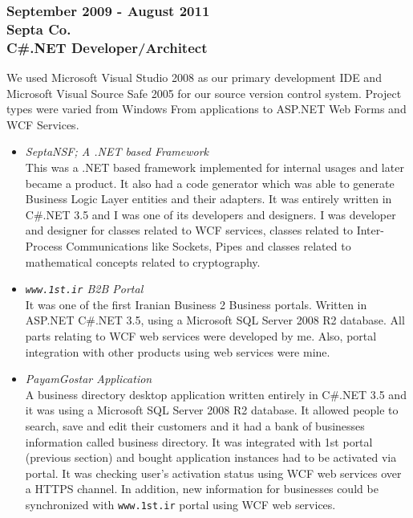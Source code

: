 \documentclass[10pt,a4paper]{article}
\begin{document}
\subsubsection{\textnormal {September 2009 - August 2011} \\ \textnormal {Septa Co.} \\ C\#.NET Developer/Architect}
  \setlength{\leftskip}{0.5cm}
  \setlength{\rightskip}{1cm}
  We used Microsoft Visual Studio 2008 as our primary development IDE and Microsoft Visual Source Safe 2005 for our source version control system. Project types were varied from Windows From applications to ASP.NET Web Forms and WCF Services.
  \begin{itemize}
		\item \small \textit{SeptaNSF; A .NET based Framework} \\
			This was a .NET based framework implemented for internal usages and later became a product. It also had a code generator which was able to generate Business Logic Layer entities and their adapters. It was entirely written in C\#.NET 3.5 and I was one of its developers and designers. I was developer and designer for classes related to WCF services, classes related to Inter-Process Communications like Sockets, Pipes and classes related to mathematical concepts related to cryptography. \\
		\item \small \textit{\texttt{www.1st.ir} B2B Portal} \\
			It was one of the first Iranian Business 2 Business portals. Written in ASP.NET C\#.NET 3.5, using a Microsoft SQL Server 2008 R2 database. All parts relating to WCF web services were developed by me. Also, portal integration with other products using web services were mine. \\
		\item \small \textit{PayamGostar Application} \\
			A business directory desktop application written entirely in C\#.NET 3.5 and it was using a Microsoft SQL Server 2008 R2 database. It allowed people to search, save and edit their customers and it had a bank of businesses information called business directory. It was integrated with 1st portal (previous section) and bought application instances had to be activated via portal. It was checking user's activation status using WCF web services over a HTTPS channel. In addition, new information for businesses could be synchronized with \texttt{www.1st.ir} portal using WCF web services. \\

\end{itemize}
\end{document}
